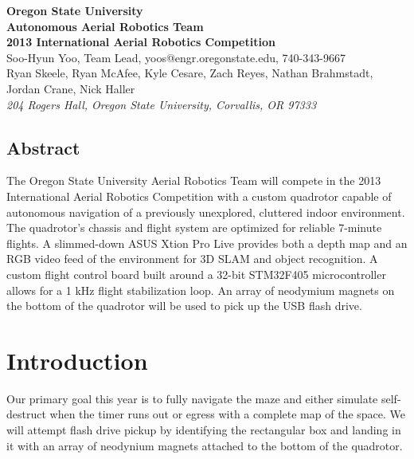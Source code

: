 \documentclass[12pt,letterpaper]{article} \usepackage[margin=1in]{geometry}
\begin{document}
\begin{center}
	{\bf\Large Oregon State University \\
		Autonomous Aerial Robotics Team \\
		2013 International Aerial Robotics Competition \\ [1em]
	}
	{\footnotesize Soo-Hyun Yoo, Team Lead, yoos@engr.oregonstate.edu, 740-343-9667 \\
		Ryan Skeele, Ryan McAfee, Kyle Cesare, Zach Reyes, Nathan Brahmstadt, Jordan Crane, Nick Haller \\ [0.5em]
		\emph{204 Rogers Hall, Oregon State University, Corvallis, OR 97333}
	}
\end{center}


\begin{center} \begin{minipage}{5.5in}

\section*{Abstract}

The Oregon State University Aerial Robotics Team will compete in the 2013
International Aerial Robotics Competition with a custom quadrotor capable of
autonomous navigation of a previously unexplored, cluttered indoor environment.
The quadrotor’s chassis and flight system are optimized for reliable 7-minute
flights. A slimmed-down ASUS Xtion Pro Live provides both a depth map and an
RGB video feed of the environment for 3D SLAM and object recognition. A custom
flight control board built around a 32-bit STM32F405 microcontroller allows for
a 1 kHz flight stabilization loop. An array of neodymium magnets on the bottom
of the quadrotor will be used to pick up the USB flash drive.

\end{minipage} \end{center}



\section*{Introduction}

Our primary goal this year is to fully navigate the maze and either simulate
self-destruct when the timer runs out or egress with a complete map of the
space. We will attempt flash drive pickup by identifying the rectangular box
and landing in it with an array of neodynium magnets attached to the bottom of
the quadrotor.
\end{document}
